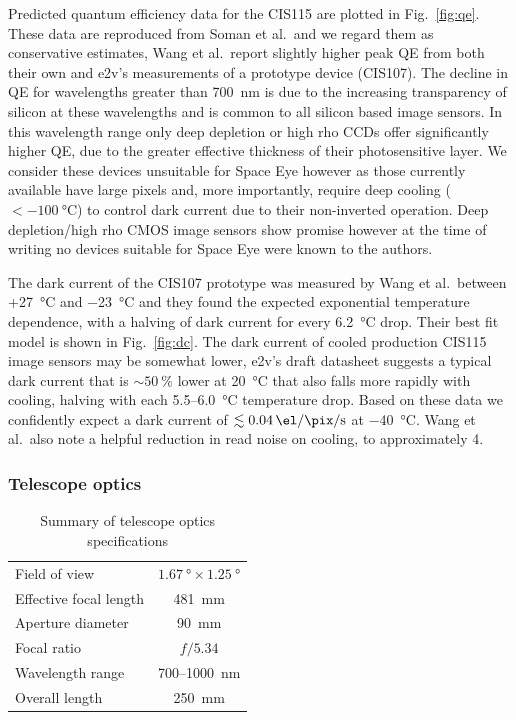 \documentclass[]{iac}
\begin{document}
Predicted quantum efficiency data for the CIS115 are plotted in Fig.~\ref{fig:qe}. These data are reproduced from Soman
et al.\cite{Soman2014}\ and we regard them as conservative estimates, Wang et al.\cite{Wang2014}\ report slightly higher
peak QE from both their own and e2v's measurements of a prototype device (CIS107). The decline in QE for wavelengths
greater than \SI{700}{\nano\metre} is due to the increasing transparency of silicon at these wavelengths and is common
to all silicon based image sensors. In this wavelength range only deep depletion or high rho CCDs offer significantly
higher QE, due to the greater effective thickness of their photosensitive layer. We consider these devices unsuitable
for Space Eye however as those currently available have large pixels and, more importantly, require deep cooling
($<\SI{-100}{\celsius}$) to control dark current due to their non-inverted operation. Deep depletion/high rho CMOS image
sensors show promise however at the time of writing no devices suitable for Space Eye were known to the authors.

The dark current of the CIS107 prototype was measured by Wang et al.\ between +\SI{27}{\celsius} and \SI{-23}{\celsius}
and they found the expected exponential temperature dependence, with a halving of dark current for every
\SI{6.2}{\celsius} drop. Their best fit model is shown in Fig.~\ref{fig:dc}. The dark current of cooled production
CIS115 image sensors may be somewhat lower, e2v's draft datasheet suggests a typical dark current that is
$\sim\SI{50}{\percent}$ lower at \SI{20}{\celsius} that also falls more rapidly with cooling, halving with each
5.5--\SI{6.0}{\celsius} temperature drop. Based on these data we confidently expect a dark current of
$\lesssim\SI{0.04}{\el\per\pix\per\second}$ at \SI{-40}{\celsius}. Wang et al.\ also note a helpful reduction in read
noise on cooling, to approximately \SI{4}{\el}.

\subsubsection{Telescope optics}

\begin{table}[bp]
  \caption{Summary of telescope optics specifications}
  \label{tab:optics}
  \begin{center}
    \begin{tabular}{lc}
      \toprule \rule[-1ex]{0pt}{3.5ex} Field of view &  $\SI{1.67}{\degree} \times \SI{1.25}{\degree}$ \\
      \rule[-1ex]{0pt}{3.5ex} Effective focal length & \SI{481}{\milli\metre} \\
      \rule[-1ex]{0pt}{3.5ex} Aperture diameter & \SI{90}{\milli\metre} \\
      \rule[-1ex]{0pt}{3.5ex} Focal ratio & $f/5.34$ \\
      \rule[-1ex]{0pt}{3.5ex} Wavelength range & 700--\SI{1000}{\nano\metre} \\
      \rule[-1ex]{0pt}{3.5ex}  Overall length & \SI{250}{\milli\metre} \\
      \bottomrule
    \end{tabular}
  \end{center}
\end{table}
\end{document}
